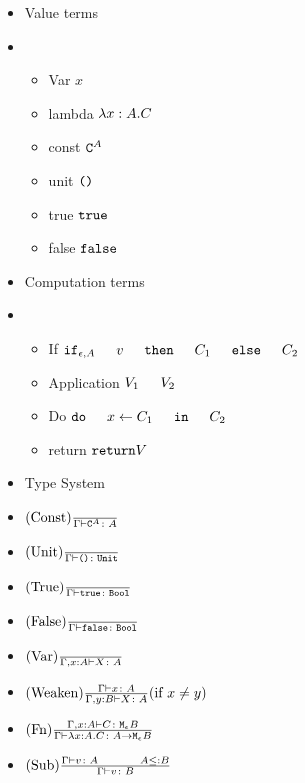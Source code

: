 \documentclass{report}
\begin{document}
    \begin{itemize}
        \item Value terms
        \item \begin{itemize}
            \item Var $x$
            
            \item lambda $\lambda x : A. C$
            \item const $\texttt{C}^{A}$
            \item unit $\texttt{()}$
            \item true $\texttt{true}$
            \item false $\texttt{false}$
        \end{itemize}
        \item Computation terms
        \item  \begin{itemize}
            \item If $\ifthenelse{\e}{A}{v}{C_1}{C_2}$
            \item Application $\apply{V_1}{V_2}$
            \item Do $\doin{x}{C_1}{C_2}$
            \item return $\texttt{return} V$
        \end{itemize}
        \item Type System
            \item $(\text{Const}) \frac{}{\Gamma \vdash \texttt{C}^{A} \colon A}$
            \item $(\text{Unit}) \frac{}{\Gamma \vdash \texttt{()} \colon \texttt{Unit}}$
            \item $(\text{True}) \frac{}{\Gamma \vdash \texttt{true} \colon \texttt{Bool}}$
            \item $(\text{False}) \frac{}{\Gamma \vdash \texttt{false} \colon \texttt{Bool}}$
            \item $(\text{Var}) \frac{}{\Gamma, x: A \vdash X \colon A}$
            \item $(\text{Weaken}) \frac{\Gamma \vdash x \colon A}{\Gamma, y: B \vdash X \colon A}(\text{if } x \neq y)$
            \item $(\text{Fn}) \frac{\Gamma, x: A \vdash C \colon \texttt{M}_{\epsilon}{B}}{\Gamma \vdash \lambda x : A. C \colon A \rightarrow \texttt{M}_{\epsilon}{B}}$
            \item $\treerule{Sub}{\typerelation{\G}{v}{A}\s\s A \subtype B}{\typerelation{\G}{v}{B}}$
        \end{itemize}
\end{document}
